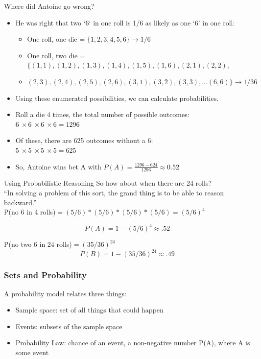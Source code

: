 \documentclass[handout]{beamer}
\numberwithin{equation}{section}
\begin{document}
\begin{frame}{Where did Antoine go wrong?}
\pause
\begin{itemize}
\item He was right that two `6` in one roll is 1/6 as likely as one `6' in one roll:
\begin{itemize}
\item One roll, one die = $\{1, 2, 3, 4, 5, 6\} \rightarrow 1/6$
\item One roll, two die = $\{(1,1), (1, 2), (1,3), (1,4), (1,5), (1,6), (2,1),(2, 2),$
\item[] $(2,3), (2,4), (2,5), (2,6), (3,1), (3, 2), (3, 3), ... (6,6)\} \rightarrow 1/36$
\end{itemize}

\item Using these enumerated possibilities, we can calculate probabilities.
\pause
\item[] Roll a die 4 times, the total number of possible outcomes:\\ $6\ \times 6\ \times 6\ \times 6 = 1296$
\item[] Of these, there are 625 outcomes without a 6:\\  $5\ \times 5\ \times 5\ \times 5 = 625$
\item So, Antoine wins bet A with $P(A)= \frac{1296-624}{1296} \approx 0.52$
\end{itemize}
\end{frame}

\begin{frame}{Using Probabilistic Reasoning}
So how about when there are 24 rolls?\\
\vspace{1 cm}
\pause
``In solving a problem of this sort, the grand thing is to be able to reason backward.'' \\
\pause
\vspace{1 cm}
P(no 6 in 4 rolls)$ = (5/6)*(5/6)*(5/6)*(5/6)=(5/6)^4$

$$P(A) = 1- (5/6)^4\approx .52$$
\pause

\vspace{1 cm}

P(no two 6 in 24 rolls)$ = (35/36)^{24}$
$$P(B)=1-(35/36)^{24} \approx .49$$
\end{frame}


\begin{frame}
\frametitle{Sets and Probability}

A probability model relates three things:\pause 
\begin{itemize}
\item[1)] Sample space: set of all things that could happen \pause 
\item[2)] Events: subsets of the sample space \pause 
\item[3)] Probability Law: chance of an event, a non-negative number P(A), where A is some event
\end{itemize}
\end{frame}
\end{document}
